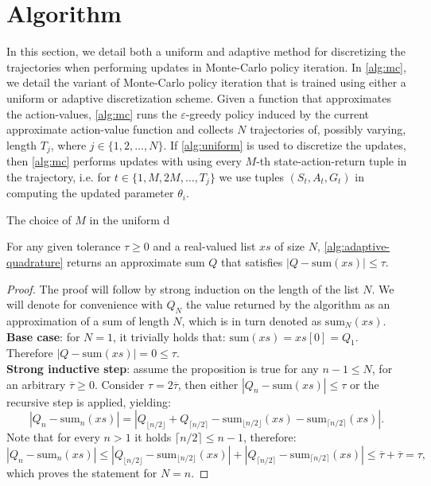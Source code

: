 \section{Algorithm}
In this section, we detail both a uniform and adaptive method for discretizing the trajectories when performing updates in Monte-Carlo policy iteration. In \cref{alg:mc}, we detail the variant of Monte-Carlo policy iteration that is trained using either a uniform or adaptive discretization scheme. Given a function that approximates the action-values, \cref{alg:mc} runs the $\varepsilon$-greedy policy induced by the current approximate action-value function and collects $N$ trajectories of, possibly varying, length $T_j$, where $j \in \{1,2,\dotsc,N\}$. If \cref{alg:uniform} is used to discretize the updates, then \cref{alg:mc} performs updates with using every $M$-th state-action-return tuple in the trajectory, i.e. for $t \in \{1,M,2M,\dotsc,T_j\}$ we use tuples $(S_t, A_t, G_t)$ in computing the updated parameter $\theta_i$. 

The choice of $M$ in the uniform d


\begin{proposition}
    For any given tolerance $\tau \geq 0$ and a real-valued list $xs$ of size $N$, \cref{alg:adaptive-quadrature} returns an approximate sum $Q$ that satisfies $|Q - \text{sum}(xs)| \leq \tau$.  
\end{proposition}
\begin{proof}
    The proof will follow by strong induction on the length of the list $N$. We will denote for convenience with $Q_N$ the value returned by the algorithm as an approximation of a sum of length $N$, which is in turn denoted as $\text{sum}_N(xs)$. \\
    \textbf{Base case}: for $N=1$, it trivially holds that: $\text{sum}(xs)=xs[0]=Q_1$. Therefore $|Q - \text{sum}(xs)|=0\leq\tau$. \\
    \textbf{Strong inductive step}: assume the proposition is true for any $n-1\leq N$, for an arbitrary $\overline{\tau}\geq0$. Consider $\tau=2\overline{\tau}$, then either $|Q_n - \text{sum}(xs)|\leq\tau$ or the recursive step is applied, yielding:
    \begin{equation}
        |Q_n - \text{sum}_n(xs)| = |Q_{\lfloor n / 2 \rfloor} + Q_{\lceil n / 2 \rceil} - \text{sum}_{\lfloor n / 2 \rfloor}(xs) - \text{sum}_{\lceil n / 2 \rceil}(xs)|.
    \end{equation}
    Note that for every $n>1$ it holds $\lceil n / 2 \rceil\leq n-1$, therefore:
    \begin{equation}
        |Q_n - \text{sum}_n(xs)| \leq |Q_{\lfloor n / 2 \rfloor} - \text{sum}_{\lfloor n / 2 \rfloor}(xs)| + |Q_{\lceil n / 2 \rceil} - \text{sum}_{\lceil n / 2 \rceil}(xs)|\leq \overline{\tau} + \overline{\tau} = \tau,
    \end{equation}
    which proves the statement for $N=n$.
\end{proof}


